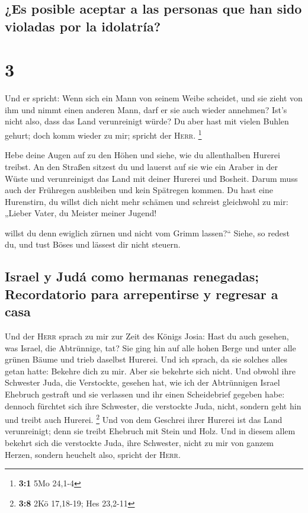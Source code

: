 \hypertarget{es-posible-aceptar-a-las-personas-que-han-sido-violadas-por-la-idolatruxeda}{%
\subsection{¿Es posible aceptar a las personas que han sido violadas por
la
idolatría?}\label{es-posible-aceptar-a-las-personas-que-han-sido-violadas-por-la-idolatruxeda}}

\hypertarget{section-2}{%
\section{3}\label{section-2}}

 Und er spricht: Wenn sich ein Mann von seinem Weibe
scheidet, und sie zieht von ihm und nimmt einen anderen Mann, darf er
sie auch wieder annehmen? Ist's nicht also, dass das Land verunreinigt
würde? Du aber hast mit vielen Buhlen gehurt; doch komm wieder zu mir;
spricht der \textsc{Herr}. \footnote{\textbf{3:1} 5Mo 24,1-4}

 Hebe deine Augen auf zu den Höhen und siehe, wie du
allenthalben Hurerei treibst. An den Straßen sitzest du und lauerst auf
sie wie ein Araber in der Wüste und verunreinigst das Land mit deiner
Hurerei und Bosheit.  Darum muss auch der Frühregen
ausbleiben und kein Spätregen kommen. Du hast eine Hurenstirn, du willst
dich nicht mehr schämen  und schreist gleichwohl zu mir:
„Lieber Vater, du Meister meiner Jugend!

 willst du denn ewiglich zürnen und nicht vom Grimm
lassen?{}`` Siehe, so redest du, und tust Böses und lässest dir nicht
steuern.

\hypertarget{israel-y-juduxe1-como-hermanas-renegadas-recordatorio-para-arrepentirse-y-regresar-a-casa}{%
\subsection{Israel y Judá como hermanas renegadas; Recordatorio para
arrepentirse y regresar a
casa}\label{israel-y-juduxe1-como-hermanas-renegadas-recordatorio-para-arrepentirse-y-regresar-a-casa}}

 Und der \textsc{Herr} sprach zu mir zur Zeit des Königs
Josia: Hast du auch gesehen, was Israel, die Abtrünnige, tat? Sie ging
hin auf alle hohen Berge und unter alle grünen Bäume und trieb daselbst
Hurerei.  Und ich sprach, da sie solches alles getan
hatte: Bekehre dich zu mir. Aber sie bekehrte sich nicht. Und obwohl
ihre Schwester Juda, die Verstockte, gesehen hat,  wie ich
der Abtrünnigen Israel Ehebruch gestraft und sie verlassen und ihr einen
Scheidebrief gegeben habe: dennoch fürchtet sich ihre Schwester, die
verstockte Juda, nicht, sondern geht hin und treibt auch Hurerei.
\footnote{\textbf{3:8} 2Kö 17,18-19; Hes 23,2-11}  Und von
dem Geschrei ihrer Hurerei ist das Land verunreinigt; denn sie treibt
Ehebruch mit Stein und Holz.  Und in diesem allem bekehrt
sich die verstockte Juda, ihre Schwester, nicht zu mir von ganzem
Herzen, sondern heuchelt also, spricht der \textsc{Herr}.

